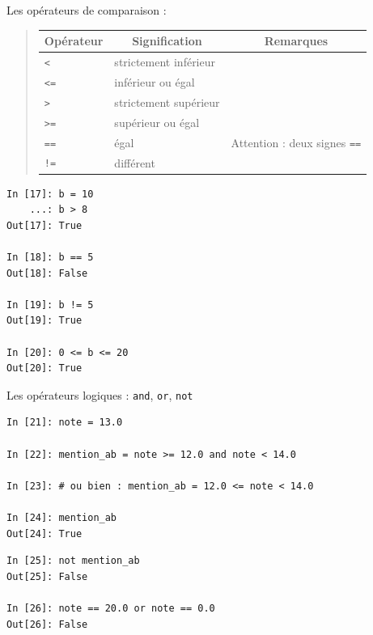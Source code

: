 \documentclass{beamer}
\begin{document}
\begin{frame}

Les opérateurs de comparaison :




\begin{quote}
\begin{tabular}{lll}
\hline
\multicolumn{1}{c}{ Opérateur } & \multicolumn{1}{c}{ Signification } & \multicolumn{1}{c}{ Remarques } \\
\hline
\texttt{<}  & strictement inférieur &                                   \\
\texttt{<=} & inférieur ou égal     &                                   \\
\texttt{>}  & strictement supérieur &                                   \\
\texttt{>=} & supérieur ou égal     &                                   \\
\texttt{==} & égal                  & Attention : deux signes \texttt{==} \\
\Verb?!=? & différent             &                                   \\
\hline
\end{tabular}
\end{quote}

\noindent
\begin{verbatim}
In [17]: b = 10
    ...: b > 8
Out[17]: True

In [18]: b == 5
Out[18]: False

In [19]: b != 5
Out[19]: True

In [20]: 0 <= b <= 20
Out[20]: True
\end{verbatim}
\end{frame}

\begin{frame}

Les opérateurs logiques : \texttt{and}, \texttt{or}, \texttt{not}

\begin{verbatim}
In [21]: note = 13.0

In [22]: mention_ab = note >= 12.0 and note < 14.0

In [23]: # ou bien : mention_ab = 12.0 <= note < 14.0

In [24]: mention_ab
Out[24]: True
\end{verbatim}

\begin{verbatim}
In [25]: not mention_ab
Out[25]: False

In [26]: note == 20.0 or note == 0.0
Out[26]: False
\end{verbatim}
\end{frame}
\end{document}
